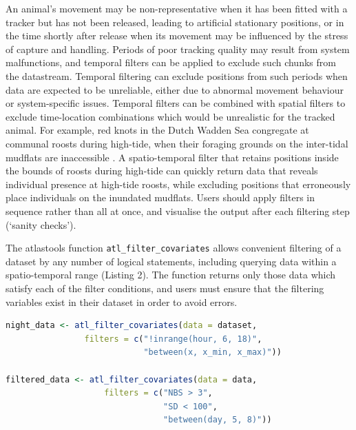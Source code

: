 \documentclass[10pt,paper=a4,headings=standardclasses
]{scrartcl}
\begin{document}
An animal’s movement may be non-representative when it has been fitted with a tracker but has not been released, leading to artificial stationary positions, or in the time shortly after release when its movement may be influenced by the stress of capture and handling.
Periods of poor tracking quality may result from system malfunctions, and temporal filters can be applied to exclude such chunks from the datastream.
Temporal filtering can exclude positions from such periods when data are expected to be unreliable, either due to abnormal movement behaviour or system-specific issues.  
Temporal filters can be combined with spatial filters to exclude time-location combinations which would be unrealistic for the tracked animal. 
For example, red knots in the Dutch Wadden Sea congregate at communal roosts during high-tide, when their foraging grounds on the inter-tidal mudflats are inaccessible \citep{vangils2006}.
A spatio-temporal filter that retains positions inside the bounds of roosts during high-tide can quickly return data that reveals individual presence at high-tide roosts, while excluding positions that erroneously place individuals on the inundated mudflats.
Users should apply filters in sequence rather than all at once, and visualise the output after each filtering step (`sanity checks').

The atlastools function \texttt{atl\_filter\_covariates} allows convenient filtering of a dataset by any number of logical statements, including querying data within a spatio-temporal range (Listing 2).
The function returns only those data which satisfy each of the filter conditions, and users must ensure that the filtering variables exist in their dataset in order to avoid errors.

\begin{lstlisting}[float, language=R, style=customR, caption = {
    Data can be filtered by a temporal or a spatio-temporal range using {atl\_filter\_covariates}. 
    Filter predicates are passed to the \texttt{filters} argument as a character vector. 
    Only rows in the data satisfying all the conditions passed as filters are retained. 
    Here, the first example shows how nighttime data can be retained using a predicate (\texttt{inrange} from \texttt{data.table}) that determine whether the value of `hour' is between 6 and 18, and also within a range of X coordinates.
    The second example retains calculated using $>$ 3 base stations (\texttt{NBS}), with location error (\texttt{SD}) $<$ 100, and data between an arbitrary day 5 and day 8.
    }]
night_data <- atl_filter_covariates(data = dataset,
                filters = c("!inrange(hour, 6, 18)",
                            "between(x, x_min, x_max)"))

filtered_data <- atl_filter_covariates(data = data,
                    filters = c("NBS > 3",
                                "SD < 100",
                                "between(day, 5, 8)"))                            
\end{lstlisting}
\end{document}
